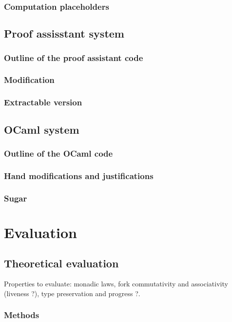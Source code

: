\documentclass[12pt,twoside,notitlepage]{report}
\begin{document}
\subsection{Computation placeholders}
\section{Proof assisstant system}
\subsection{Outline of the proof assistant code}
\subsection{Modification}
\subsection{Extractable version}
\section{OCaml system}
\subsection{Outline of the OCaml code}
\subsection{Hand modifications and justifications}
\subsection{Sugar}



\cleardoublepage
\chapter{Evaluation}

\section{Theoretical evaluation}
Properties to evaluate: monadic laws, fork commutativity and associativity (liveness ?), type preservation and progress ?.

\subsection{Methods}
\end{document}
